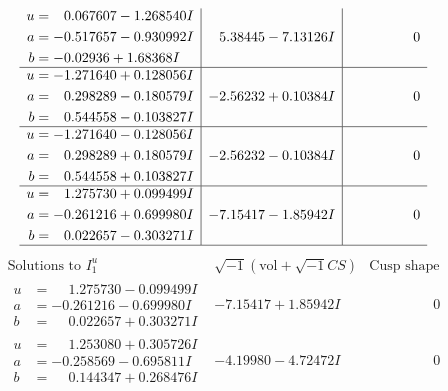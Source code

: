 \documentclass[1p]{elsarticle_modified}
\theoremstyle{definition}
\newcommand{\I}{\sqrt{-1}}
\begin{document}
$$\begin{array}{c|c|c}
\begin{aligned}
u &= \phantom{-}0.067607 - 1.268540 I \\
a &= -0.517657 - 0.930992 I \\
b &= -0.02936 + 1.68368 I\end{aligned}
 & \phantom{-}5.38445 - 7.13126 I & \phantom{-0.000000 } 0 \\ \hline\begin{aligned}
u &= -1.271640 + 0.128056 I \\
a &= \phantom{-}0.298289 - 0.180579 I \\
b &= \phantom{-}0.544558 - 0.103827 I\end{aligned}
 & -2.56232 + 0.10384 I & \phantom{-0.000000 } 0 \\ \hline\begin{aligned}
u &= -1.271640 - 0.128056 I \\
a &= \phantom{-}0.298289 + 0.180579 I \\
b &= \phantom{-}0.544558 + 0.103827 I\end{aligned}
 & -2.56232 - 0.10384 I & \phantom{-0.000000 } 0 \\ \hline\begin{aligned}
u &= \phantom{-}1.275730 + 0.099499 I \\
a &= -0.261216 + 0.699980 I \\
b &= \phantom{-}0.022657 - 0.303271 I\end{aligned}
 & -7.15417 - 1.85942 I & \phantom{-0.000000 } 0\\
 \hline 
 \end{array}$$\newpage$$\begin{array}{c|c|c}  
\text{Solutions to }I^u_{1}& \I (\text{vol} + \sqrt{-1}CS) & \text{Cusp shape}\\
 \hline 
\begin{aligned}
u &= \phantom{-}1.275730 - 0.099499 I \\
a &= -0.261216 - 0.699980 I \\
b &= \phantom{-}0.022657 + 0.303271 I\end{aligned}
 & -7.15417 + 1.85942 I & \phantom{-0.000000 } 0 \\ \hline\begin{aligned}
u &= \phantom{-}1.253080 + 0.305726 I \\
a &= -0.258569 - 0.695811 I \\
b &= \phantom{-}0.144347 + 0.268476 I\end{aligned}
 & -4.19980 - 4.72472 I & \phantom{-0.000000 } 0 \\ \hline\begin{aligned}

\end{aligned}
\end{array}$$
\end{document}

